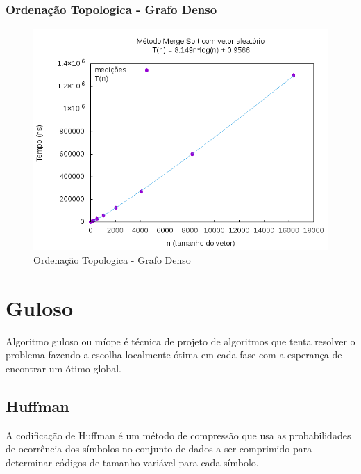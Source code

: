 \documentclass[12pt,a4paper,twoside]{report}
\begin{document}
\subsection{Ordenação Topologica - Grafo Denso}
\begin{figure}[H]
    \centering
    \includegraphics[width=0.7\linewidth]{graficos/MergeSort/vIntAleatorio/vIntAleatorio.png}
  \caption{Ordenação Topologica - Grafo Denso}
\end{figure}

\chapter{Guloso}

Algoritmo guloso ou míope é técnica de projeto de algoritmos que tenta resolver o problema fazendo a escolha localmente ótima em cada fase com a esperança de encontrar um ótimo global.

\section{Huffman}

A codificação de Huffman é um método de compressão que usa as probabilidades de ocorrência dos símbolos no conjunto de dados a ser comprimido para determinar códigos de tamanho variável para cada símbolo.
\end{document}
